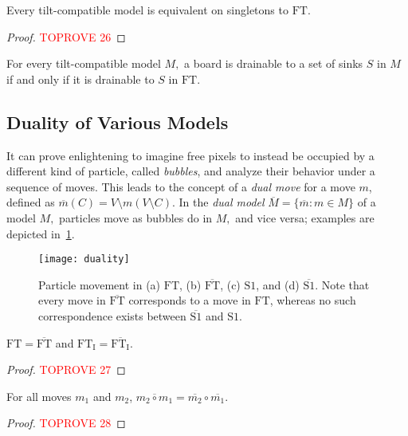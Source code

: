 \documentclass[a4paper,UKenglish,cleveref,thm-restate]{lipics-v2021}
\newcommand{\FT}{\ensuremath{\mathrm{FT}}\xspace}
\newcommand{\SSt}{\ensuremath{\mathrm{S1}}\xspace}
\newcommand{\IE}[1][\FT]{\ensuremath{{#1}_\mathrm{I}}\xspace}
\newcommand{\dual}[1]{\ensuremath{\overline{#1}}\xspace}
\begin{document}
\begin{proposition}\label{tc_equiv_ft}
Every tilt-compatible model is equivalent on singletons to \FT.
\end{proposition}
\begin{proof}\textcolor{red}{TOPROVE 26}\end{proof}

\begin{corollary}\label{cor:drainable-tc}
For every tilt-compatible model $M,$ a board is drainable to a set of sinks $S$
in $M$ if and only if it is drainable to $S$ in \FT.
\end{corollary}

\subsection{Duality of Various Models}\label{subsec:duality}

It can prove enlightening to imagine free pixels to instead be occupied by a
different kind of particle, called \emph{bubbles}, and analyze their behavior
under a sequence of moves. This leads to the concept of a \emph{dual move} for a
move $m$, defined as $\dual{m}(C) = V \setminus m(V \setminus C)$. In the
\emph{dual model} \(\dual{M} = \{\dual{m}: m \in M\}\) of a model $M,$ particles
move as bubbles do in $M,$ and vice versa; examples are depicted in~\cref{fig:duality}.

\begin{figure}[htb]
\centering
\texttt{[image: duality]}\caption{Particle movement in (a) \FT, (b) \dual{\FT}, (c) \SSt, and (d)
  \dual{\SSt}. Note that every move in \dual{\FT} corresponds to a move in \FT,
  whereas no such correspondence exists between \dual{\SSt} and
  \SSt.}\label{fig:duality}
\end{figure}

\begin{proposition}\label{prop:ft-dual}
\(\FT = \dual{\FT}\) and \(\IE = \dual{\IE}\).
\end{proposition}
\begin{proof}\textcolor{red}{TOPROVE 27}\end{proof}

\begin{lemma}
    \label{dual_composition}
    For all moves $m_1$ and $m_2$, \(\dual{m_2 \circ m_1} = \dual{m_2} \circ
    \dual{m_1}\).
\end{lemma}
\begin{proof}\textcolor{red}{TOPROVE 28}\end{proof}
\end{document}

